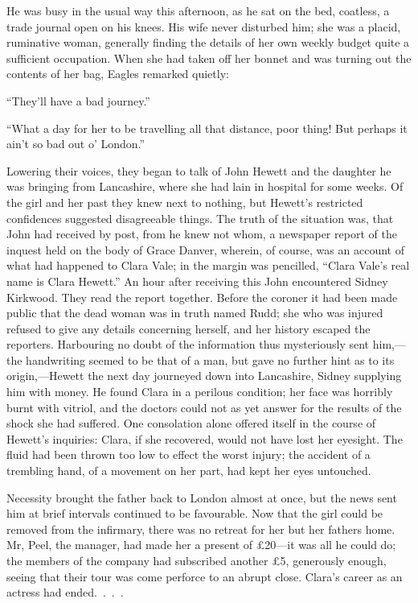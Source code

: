 {\protect\hypertarget{294}{}{}}He was busy in the usual way this
afternoon, as he sat on the bed, coatless, a trade journal open on his
knees. His wife never disturbed him; she was a placid, ruminative woman,
generally finding the details of her own weekly budget quite a
sufficient occupation. When she had taken off her bonnet and was turning
out the contents of her bag, Eagles remarked quietly:

``They'll have a bad journey.''

``What a day for her to be travelling all that distance, poor thing! But
perhaps it ain't so bad out o' London.''

Lowering their voices, they began to talk of John Hewett and the
daughter he was bringing from Lancashire, where she had lain in hospital
for some weeks. Of the girl and her past they knew next to nothing, but
Hewett's restricted confidences suggested disagreeable things. The truth
of the situation was, that John had received by post, from he knew not
whom, a newspaper report of the inquest held on the body of Grace
Danver, wherein, of course, was an account of what
{\protect\hypertarget{295}{}{}}had happened to Clara Vale; in the margin
was pencilled, ``Clara Vale's real name is Clara Hewett.'' An hour after
receiving this John encountered Sidney Kirkwood. They read the report
together. Before the coroner it had been made public that the dead woman
was in truth named Rudd; she who was injured refused to give any details
concerning herself, and her history escaped the reporters. Harbouring no
doubt of the information thus mysteriously sent him,---the handwriting
seemed to be that of a man, but gave no further hint as to its
origin,---Hewett the next day journeyed down into Lancashire, Sidney
supplying him with money. He found Clara in a perilous condition; her
face was horribly burnt with vitriol, and the doctors could not as yet
answer for the results of the shock she had suffered. One consolation
alone offered itself in the course of Hewett's inquiries: Clara, if she
recovered, would not have lost her eyesight. The fluid had been thrown
too low to effect the worst injury; the accident of a trembling hand, of
a movement on her part, had kept her eyes untouched.

{\protect\hypertarget{296}{}{}}Necessity brought the father back to
London almost at once, but the news sent him at brief intervals
continued to be favourable. Now that the girl could be removed from the
infirmary, there was no retreat for her but her fathers home. Mr, Peel,
the manager, had made her a present of £20---it was all he could do; the
members of the company had subscribed another £5, generously enough,
seeing that their tour was come perforce to an abrupt close. Clara's
career as an actress had ended{.~.~.~.}

